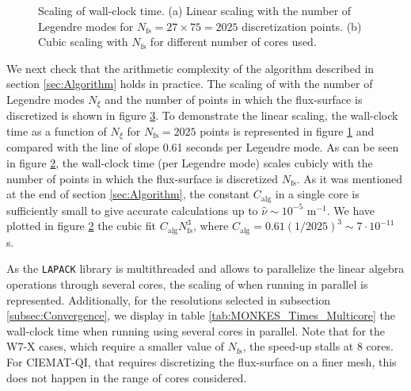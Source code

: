 \begin{figure}[h]
	\centering
	\begin{subfigure}[t]{0.35\textwidth}
		
		\caption{}
		\label{subfig:MONKES_Scaling_Legendre}
	\end{subfigure}    
	\begin{subfigure}[t]{0.35\textwidth}
		
		\caption{}
		\label{subfig:MONKES_Scaling_Nfs}
	\end{subfigure}
	\caption{Scaling of {\MONKES} wall-clock time. (a) Linear scaling with the number of Legendre modes for $N_{\text{fs}}=27\times 75 = 2025$ discretization points. (b) Cubic scaling with $N_{\text{fs}}$ for different number of cores used.}
	\label{fig:MONKES_Scaling}
\end{figure}

We next check that the arithmetic complexity of the algorithm described in section \ref{sec:Algorithm} holds in practice. The scaling of {\MONKES} with the number of Legendre modes $N_\xi$ and the number of points in which the flux-surface is discretized is shown in figure \ref{fig:MONKES_Scaling}. To demonstrate the linear scaling, the wall-clock time as a function of $N_\xi$ for $N_{\text{fs}}=2025$ points is represented in figure \ref{subfig:MONKES_Scaling_Legendre} and compared with the line of slope 0.61 seconds per Legendre mode. As can be seen in figure \ref{subfig:MONKES_Scaling_Nfs}, the wall-clock time (per Legendre mode) scales cubicly with the number of points in which the flux-surface is discretized $N_{\text{fs}}$. As it was mentioned at the end of section \ref{sec:Algorithm}, the constant $C_{\text{alg}}$ in a single core is sufficiently small to give accurate calculations up to $\hat{\nu}\sim 10^{-5}$ $\text{m}^{-1}$. We have plotted in figure \ref{subfig:MONKES_Scaling_Nfs} the cubic fit $C_{\text{alg}}N_{\text{fs}}^3$, where $C_{\text{alg}}=0.61(1/2025)^3\sim 7\cdot 10^{-11}$ s. 

As the {\texttt{LAPACK}} library is multithreaded and allows to parallelize the linear algebra operations through several cores, the scaling of {\MONKES} when running in parallel is represented. Additionally, for the resolutions selected in subsection \ref{subsec:Convergence}, we display in table \ref{tab:MONKES_Times_Multicore} the wall-clock time when running {\MONKES} using several cores in parallel. Note that for the W7-X cases, which require a smaller value of $N_{\text{fs}}$, the speed-up stalls at 8 cores. For CIEMAT-QI, that requires discretizing the flux-surface on a finer mesh, this does not happen in the range of cores considered.


